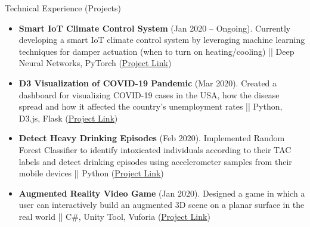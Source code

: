 \documentclass[]{mcdowellcv}
\begin{document}
	\begin{cvsection}{Technical Experience (Projects)}
		\begin{cvsubsection}{}{}{}
			\begin{itemize}
    			\item \textbf{Smart IoT Climate Control System} (Jan 2020 -- Ongoing). Currently developing a smart IoT climate control system by leveraging machine learning techniques for damper actuation (when to turn on heating/cooling) || Deep Neural Networks, PyTorch (\href{https://github.com/shanujshekhar/Smart-IOT-Climate-Control-System}{\underline{Project Link}})
    	    \end{itemize}
		\end{cvsubsection}
    	\begin{cvsubsection}{}{}{}
			\begin{itemize}
				\item \textbf{D3 Visualization of COVID-19 Pandemic} (Mar 2020). Created a dashboard for visualizing COVID-19 cases in the USA, how the disease spread and how it affected the country’s unemployment rates || Python, D3.js, Flask (\href{https://github.com/shanujshekhar/CoronaVIZ}{\underline{Project Link}})
			\end{itemize}
		\end{cvsubsection}
	    \begin{cvsubsection}{}{}{}
			\begin{itemize}
				\item \textbf{Detect Heavy Drinking Episodes} (Feb 2020). Implemented Random Forest Classifier to identify intoxicated individuals according to their TAC labels and detect drinking episodes using accelerometer samples from their mobile devices || Python (\href{https://github.com/shanujshekhar/Detect_Heavy_Drinking_Episodes}{\underline{Project Link}})
			\end{itemize}
		\end{cvsubsection}
		\begin{cvsubsection}{}{}{}
			\begin{itemize}
				\item \textbf{Augmented Reality Video Game} (Jan 2020). Designed a game in which a user can interactively build an augmented 3D scene on a planar surface in the real world || C\#, Unity Tool, Vuforia (\href{https://github.com/shanujshekhar/Augmented_Reality_Video_Game_using_Unity_Tool}{\underline{Project Link}})
			\end{itemize}
		\end{cvsubsection}
	    \begin{cvsubsection}{}{}{}

\end{cvsubsection}
\end{cvsection}
\end{document}
